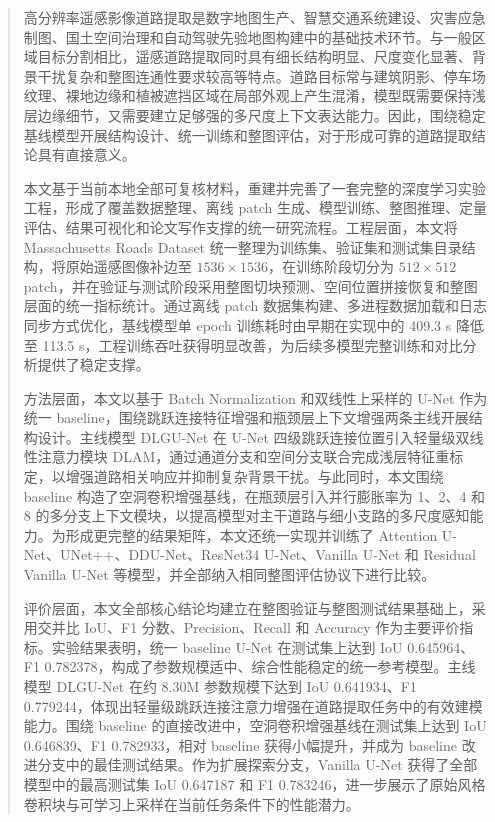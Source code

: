 
\begin{abstract}
高分辨率遥感影像道路提取是数字地图生产、智慧交通系统建设、灾害应急制图、国土空间治理和自动驾驶先验地图构建中的基础技术环节。与一般区域目标分割相比，遥感道路提取同时具有细长结构明显、尺度变化显著、背景干扰复杂和整图连通性要求较高等特点。道路目标常与建筑阴影、停车场纹理、裸地边缘和植被遮挡区域在局部外观上产生混淆，模型既需要保持浅层边缘细节，又需要建立足够强的多尺度上下文表达能力。因此，围绕稳定基线模型开展结构设计、统一训练和整图评估，对于形成可靠的道路提取结论具有直接意义。

本文基于当前本地全部可复核材料，重建并完善了一套完整的深度学习实验工程，形成了覆盖数据整理、离线 patch 生成、模型训练、整图推理、定量评估、结果可视化和论文写作支撑的统一研究流程。工程层面，本文将 Massachusetts Roads Dataset 统一整理为训练集、验证集和测试集目录结构，将原始遥感图像补边至 $1536 \times 1536$，在训练阶段切分为 $512 \times 512$ patch，并在验证与测试阶段采用整图切块预测、空间位置拼接恢复和整图层面的统一指标统计。通过离线 patch 数据集构建、多进程数据加载和日志同步方式优化，基线模型单 epoch 训练耗时由早期在实现中的 409.3 s 降低至 113.5 s，工程训练吞吐获得明显改善，为后续多模型完整训练和对比分析提供了稳定支撑。

方法层面，本文以基于 Batch Normalization 和双线性上采样的 U-Net 作为统一 baseline，围绕跳跃连接特征增强和瓶颈层上下文增强两条主线开展结构设计。主线模型 DLGU-Net 在 U-Net 四级跳跃连接位置引入轻量级双线性注意力模块 DLAM，通过通道分支和空间分支联合完成浅层特征重标定，以增强道路相关响应并抑制复杂背景干扰。与此同时，本文围绕 baseline 构造了空洞卷积增强基线，在瓶颈层引入并行膨胀率为 1、2、4 和 8 的多分支上下文模块，以提高模型对主干道路与细小支路的多尺度感知能力。为形成更完整的结果矩阵，本文还统一实现并训练了 Attention U-Net、UNet++、DDU-Net、ResNet34 U-Net、Vanilla U-Net 和 Residual Vanilla U-Net 等模型，并全部纳入相同整图评估协议下进行比较。

评价层面，本文全部核心结论均建立在整图验证与整图测试结果基础上，采用交并比 IoU、F1 分数、Precision、Recall 和 Accuracy 作为主要评价指标。实验结果表明，统一 baseline U-Net 在测试集上达到 IoU 0.645964、F1 0.782378，构成了参数规模适中、综合性能稳定的统一参考模型。主线模型 DLGU-Net 在约 8.30M 参数规模下达到 IoU 0.641934、F1 0.779244，体现出轻量级跳跃连接注意力增强在道路提取任务中的有效建模能力。围绕 baseline 的直接改进中，空洞卷积增强基线在测试集上达到 IoU 0.646839、F1 0.782933，相对 baseline 获得小幅提升，并成为 baseline 改进分支中的最佳测试结果。作为扩展探索分支，Vanilla U-Net 获得了全部模型中的最高测试集 IoU 0.647187 和 F1 0.783246，进一步展示了原始风格卷积块与可学习上采样在当前任务条件下的性能潜力。


\end{abstract}
